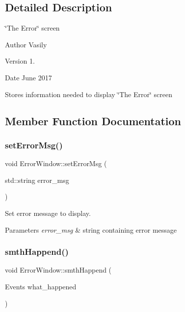 \subsection{Detailed Description}
\char`\"{}\+The Error\char`\"{} screen 

\begin{DoxyAuthor}{Author}
Vasily 
\end{DoxyAuthor}
\begin{DoxyVersion}{Version}
1. 
\end{DoxyVersion}
\begin{DoxyDate}{Date}
June 2017
\end{DoxyDate}
Stores information needed to display \char`\"{}\+The Error\char`\"{} screen 

\subsection{Member Function Documentation}
\mbox{\label{class_error_window_ac5adc252881ca2932b4804a51da44d3e}} 
\subsubsection{\texorpdfstring{set\+Error\+Msg()}{setErrorMsg()}}
{\footnotesize\ttfamily void Error\+Window\+::set\+Error\+Msg (\begin{DoxyParamCaption}\item[{std\+::string}]{error\+\_\+msg }\end{DoxyParamCaption})}



Set error message to display. 


\begin{DoxyParams}{Parameters}
{\em error\+\_\+msg} & string containing error message \\
\hline
\end{DoxyParams}
\mbox{\label{class_error_window_af9096dfdd53c4e788e62ce543f939f01}} 
\subsubsection{\texorpdfstring{smth\+Happend()}{smthHappend()}}
{\footnotesize\ttfamily void Error\+Window\+::smth\+Happend (\begin{DoxyParamCaption}\item[{Events}]{what\+\_\+happened }\end{DoxyParamCaption})\hspace{0.3cm}{\ttfamily [virtual]}}



